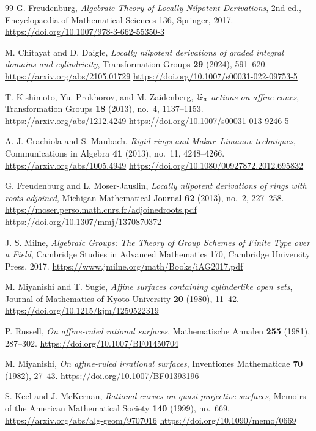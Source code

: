 \begin{thebibliography}{99}
G. Freudenburg,
\emph{Algebraic Theory of Locally Nilpotent Derivations},
2nd ed., Encyclopaedia of Mathematical Sciences 136, Springer, 2017.
\url{https://doi.org/10.1007/978-3-662-55350-3}


M. Chitayat and D. Daigle,
\emph{Locally nilpotent derivations of graded integral domains and cylindricity},
Transformation Groups \textbf{29} (2024), 591--620.
\url{https://arxiv.org/abs/2105.01729}\quad
\url{https://doi.org/10.1007/s00031-022-09753-5}

T. Kishimoto, Yu. Prokhorov, and M. Zaidenberg,
\emph{$\mathbb G_a$-actions on affine cones},
Transformation Groups \textbf{18} (2013), no.~4, 1137--1153.
\url{https://arxiv.org/abs/1212.4249}\quad
\url{https://doi.org/10.1007/s00031-013-9246-5}

A. J. Crachiola and S. Maubach,
\emph{Rigid rings and Makar--Limanov techniques},
Communications in Algebra \textbf{41} (2013), no.~11, 4248--4266.
\url{https://arxiv.org/abs/1005.4949}\quad
\url{https://doi.org/10.1080/00927872.2012.695832}

G. Freudenburg and L. Moser-Jauslin,
\emph{Locally nilpotent derivations of rings with roots adjoined},
Michigan Mathematical Journal \textbf{62} (2013), no.~2, 227--258.
\url{https://moser.perso.math.cnrs.fr/adjoinedroots.pdf}\quad
\url{https://doi.org/10.1307/mmj/1370870372}

J. S. Milne,
\emph{Algebraic Groups: The Theory of Group Schemes of Finite Type over a Field},
Cambridge Studies in Advanced Mathematics 170, Cambridge University Press, 2017.
\url{https://www.jmilne.org/math/Books/iAG2017.pdf}

M. Miyanishi and T. Sugie,
\emph{Affine surfaces containing cylinderlike open sets},
Journal of Mathematics of Kyoto University \textbf{20} (1980), 11--42.
\url{https://doi.org/10.1215/kjm/1250522319}


P. Russell,
\emph{On affine-ruled rational surfaces},
Mathematische Annalen \textbf{255} (1981), 287--302.
\url{https://doi.org/10.1007/BF01450704}

M. Miyanishi,
\emph{On affine-ruled irrational surfaces},
Inventiones Mathematicae \textbf{70} (1982), 27--43.
\url{https://doi.org/10.1007/BF01393196}

S. Keel and J. McKernan,
\emph{Rational curves on quasi-projective surfaces},
Memoirs of the American Mathematical Society \textbf{140} (1999), no.~669.
\url{https://arxiv.org/abs/alg-geom/9707016}\quad
\url{https://doi.org/10.1090/memo/0669}


\end{thebibliography}
